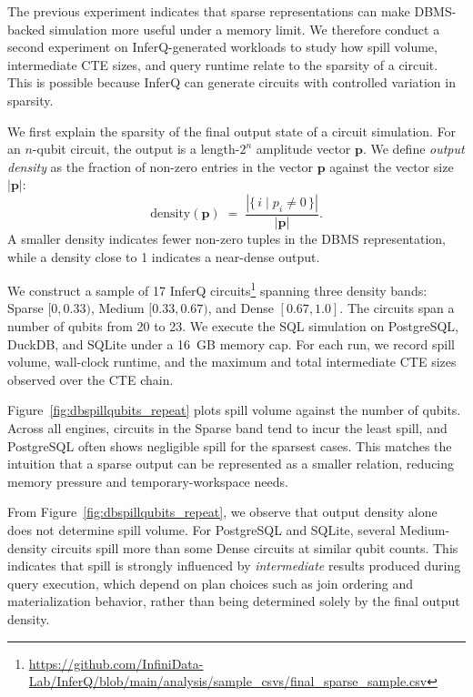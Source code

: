 The previous experiment indicates that sparse representations can make DBMS-backed
simulation more useful under a memory limit.   
We therefore conduct a second experiment on
InferQ-generated workloads to study how spill volume, intermediate CTE sizes, and query
runtime relate to the sparsity of a circuit.
This is possible because InferQ can generate circuits
with controlled variation in sparsity.

We first explain the sparsity of the final output state of a circuit simulation.
For an $n$-qubit circuit, the output is a length-$2^n$ amplitude vector
$\mathbf{p}$. We define \emph{output density} as the fraction of non-zero entries in the vector $\mathbf{p}$ against the vector size $|\mathbf{p}|$:
\[
\mathrm{density}(\mathbf{p}) \;=\; \frac{\left|\{\, i \mid p_i \neq 0 \,\}\right|}{|\mathbf{p}|}.
\]
A smaller density indicates fewer non-zero tuples in the DBMS representation, while a
density close to 1 indicates a near-dense output.

\medskip
{}
We construct a sample of 17 InferQ circuits\footnote{\url{https://github.com/InfiniData-Lab/InferQ/blob/main/analysis/sample_csvs/final_sparse_sample.csv}}
spanning three density bands: Sparse $[0,0.33)$, Medium $[0.33,0.67)$, and Dense
$[0.67,1.0]$. The circuits span a number of qubits from 20 to 23. 
We execute the
SQL simulation on PostgreSQL, DuckDB, and SQLite under a 16~GB memory cap. For each run,
we record spill volume, wall-clock runtime, and the maximum and total intermediate CTE
sizes observed over the CTE chain.

\medskip
{}
Figure~\ref{fig:dbspillqubits_repeat} plots spill volume against the number of qubits. Across
all engines, circuits in the Sparse band tend to incur the least spill, and PostgreSQL
often shows negligible spill for the sparsest cases. This matches the intuition that a
sparse output can be represented as a smaller relation, reducing memory pressure and
temporary-workspace needs.

From Figure~\ref{fig:dbspillqubits_repeat}, we observe that output density alone does not determine spill volume. For PostgreSQL and SQLite, several
Medium-density circuits spill more than some Dense circuits at similar qubit counts. This indicates that spill is strongly influenced by
\emph{intermediate} results produced during query execution, which depend on plan choices
such as join ordering and materialization behavior, rather than being determined solely
by the final output density.





